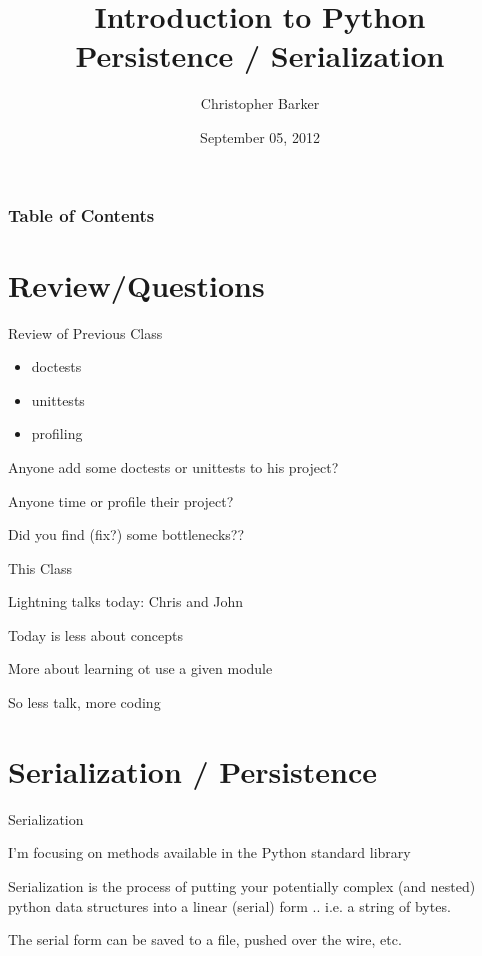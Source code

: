 \documentclass{beamer}
\title[Intro to Python: Week 10]{Introduction  to Python \\ Persistence / Serialization}
\author{Christopher Barker}
\institute{UW Continuing Education / Isilon}
\date{September 05, 2012}
\begin{document}
\begin{frame}
  \titlepage
\end{frame}

\begin{frame}
\frametitle{Table of Contents}
  \tableofcontents
\end{frame}


\section{Review/Questions}

\begin{frame}{Review of Previous Class}

{\Large
\begin{itemize}
  \item doctests
  \item unittests
  \item profiling
\end{itemize}
}


\vfill
{\Large Anyone add some doctests or unittests to his project?}

\vfill
{\Large Anyone time or profile their project?}

\vfill
{\Large Did you find (fix?) some bottlenecks??}

\end{frame}

\begin{frame}{This Class}

{\Large Lightning talks today: Chris and John}

\vfill
{\Large Today is less about concepts}

\vfill
{\Large More about learning ot use a given module}

\vfill
{\Large So less talk, more coding}

\end{frame}


\section{Serialization / Persistence}

\begin{frame}[fragile]{Serialization}

\vfill
{\Large I'm focusing on methods available in the Python standard library}

\vfill
{\Large Serialization is the process of putting your potentially complex
(and nested) python data structures into a linear (serial) form .. i.e. a string of bytes.}

\vfill
{\Large The serial form can be saved to a file, pushed over the wire, etc.}

\end{frame} 
\end{document}

